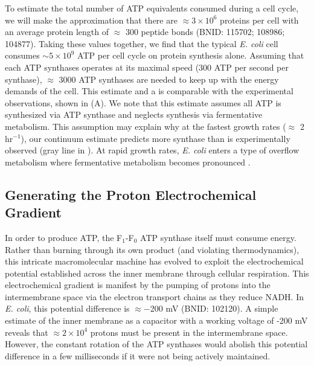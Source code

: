 To estimate the total number of ATP equivalents consumed during a cell cycle, we
will make the approximation that there are $\approx 3\times10^6$ proteins per
cell with an average protein length of $\approx$ 300 peptide bonds (BNID:
115702; 108986; 104877). Taking these values together, we find that the typical
\textit{E. coli} cell consumes $\sim 5 \times 10^9$ ATP per cell cycle on
protein synthesis alone. Assuming that each ATP synthases operates at its
maximal speed (300 ATP per second per synthase), $\approx$ 3000 ATP synthases
are needed to keep up with the energy demands of the cell. This estimate and a
is comparable with the experimental observations,  shown in
 (A). We note that this estimate assumes all ATP is
synthesized via ATP synthase and neglects synthesis via fermentative metabolism.
This assumption may explain why at the fastest growth rates ($\approx$ 2
hr$^{-1}$), our continuum estimate predicts more synthase than is experimentally
observed (gray line in ). At rapid growth rates,
\textit{E. coli} enters a type of overflow metabolism where fermentative
metabolism becomes pronounced \cite{szenk2017}.


\subsection{Generating the Proton Electrochemical Gradient}
In order to produce ATP, the F$_1$-F$_0$ ATP synthase itself must consume
energy. Rather than burning through its own product (and violating
thermodynamics), this intricate macromolecular machine has evolved to exploit
the electrochemical potential established across the inner membrane through
cellular respiration. This electrochemical gradient is manifest by the pumping
of protons into the intermembrane space via the electron transport chains as
they reduce NADH. In \textit{E. coli}, this potential difference is $\approx
-$200 mV (BNID: 102120). A simple estimate of the inner membrane as a capacitor
with a working voltage of -200 mV reveals that $\approx 2\times 10^4$ protons
must be present in the intermembrane space. However, the constant rotation of the ATP synthases would abolish
this potential difference in a few milliseconds if it were not being actively
maintained.

